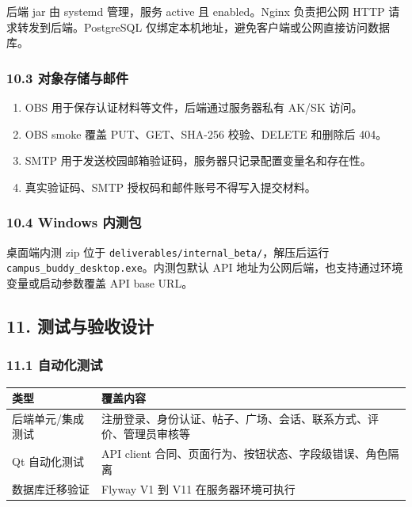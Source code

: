 \documentclass[
]{ctexart}
\providecommand{\tightlist}{%
  \setlength{\itemsep}{0pt}\setlength{\parskip}{0pt}}
\begin{document}
后端 jar 由 systemd 管理，服务 active 且 enabled。Nginx 负责把公网 HTTP
请求转发到后端。PostgreSQL
仅绑定本机地址，避免客户端或公网直接访问数据库。

\hypertarget{ux5bf9ux8c61ux5b58ux50a8ux4e0eux90aeux4ef6}{%
\subsubsection{10.3
对象存储与邮件}\label{ux5bf9ux8c61ux5b58ux50a8ux4e0eux90aeux4ef6}}

\begin{enumerate}
\def\labelenumi{\arabic{enumi}.}
\tightlist
\item
  OBS 用于保存认证材料等文件，后端通过服务器私有 AK/SK 访问。
\item
  OBS smoke 覆盖 PUT、GET、SHA-256 校验、DELETE 和删除后 404。
\item
  SMTP 用于发送校园邮箱验证码，服务器只记录配置变量名和存在性。
\item
  真实验证码、SMTP 授权码和邮件账号不得写入提交材料。
\end{enumerate}

\hypertarget{windows-ux5185ux6d4bux5305}{%
\subsubsection{10.4 Windows 内测包}\label{windows-ux5185ux6d4bux5305}}

桌面端内测 zip 位于 \texttt{deliverables/internal\_beta/}，解压后运行
\texttt{campus\_buddy\_desktop.exe}。内测包默认 API
地址为公网后端，也支持通过环境变量或启动参数覆盖 API base URL。

\hypertarget{ux6d4bux8bd5ux4e0eux9a8cux6536ux8bbeux8ba1}{%
\subsection{11.
测试与验收设计}\label{ux6d4bux8bd5ux4e0eux9a8cux6536ux8bbeux8ba1}}

\hypertarget{ux81eaux52a8ux5316ux6d4bux8bd5}{%
\subsubsection{11.1 自动化测试}\label{ux81eaux52a8ux5316ux6d4bux8bd5}}

\begin{longtable}[]{@{}ll@{}}
\toprule
类型 & 覆盖内容 \\
\midrule
\endhead
后端单元/集成测试 &
注册登录、身份认证、帖子、广场、会话、联系方式、评价、管理员审核等 \\
Qt 自动化测试 & API client
合同、页面行为、按钮状态、字段级错误、角色隔离 \\
数据库迁移验证 & Flyway V1 到 V11 在服务器环境可执行 \\
\bottomrule
\end{longtable}
\end{document}
